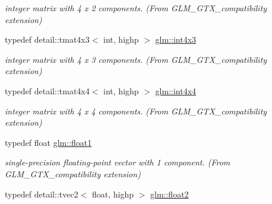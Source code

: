 \begin{CompactItemize}
\begin{CompactList}\small\item\em integer matrix with 4 x 2 components. (From GLM\_\-GTX\_\-compatibility extension) \item\end{CompactList}\item 
\hypertarget{group__gtx__compatibility_ga80ec1b785920a08d366b3c09859d888}{
typedef detail::tmat4x3$<$ int, highp $>$ \hyperlink{group__gtx__compatibility_ga80ec1b785920a08d366b3c09859d888}{glm::int4x3}}
\label{group__gtx__compatibility_ga80ec1b785920a08d366b3c09859d888}

\begin{CompactList}\small\item\em integer matrix with 4 x 3 components. (From GLM\_\-GTX\_\-compatibility extension) \item\end{CompactList}\item 
\hypertarget{group__gtx__compatibility_g5f8072c2dce67ad49939e12b168d1de1}{
typedef detail::tmat4x4$<$ int, highp $>$ \hyperlink{group__gtx__compatibility_g5f8072c2dce67ad49939e12b168d1de1}{glm::int4x4}}
\label{group__gtx__compatibility_g5f8072c2dce67ad49939e12b168d1de1}

\begin{CompactList}\small\item\em integer matrix with 4 x 4 components. (From GLM\_\-GTX\_\-compatibility extension) \item\end{CompactList}\item 
\hypertarget{group__gtx__compatibility_ge0ad1b0450320cda98bbbecb56bc3167}{
typedef float \hyperlink{group__gtx__compatibility_ge0ad1b0450320cda98bbbecb56bc3167}{glm::float1}}
\label{group__gtx__compatibility_ge0ad1b0450320cda98bbbecb56bc3167}

\begin{CompactList}\small\item\em single-precision floating-point vector with 1 component. (From GLM\_\-GTX\_\-compatibility extension) \item\end{CompactList}\item 
\hypertarget{group__gtx__compatibility_g6ab0b791bbb15ef51a0e930a8710e6b1}{
typedef detail::tvec2$<$ float, highp $>$ \hyperlink{group__gtx__compatibility_g6ab0b791bbb15ef51a0e930a8710e6b1}{glm::float2}}
\label{group__gtx__compatibility_g6ab0b791bbb15ef51a0e930a8710e6b1}


\end{CompactItemize}
